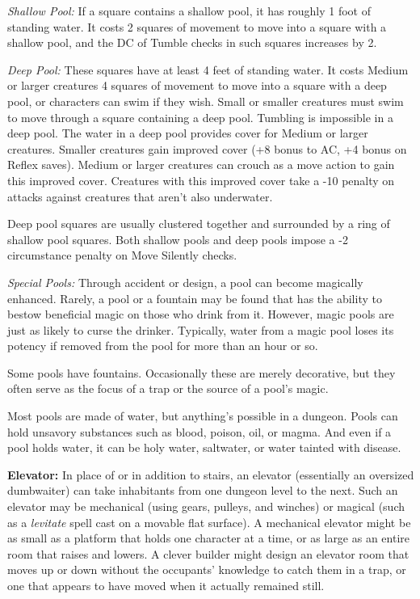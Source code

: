 \documentclass{article}
\begin{document}
\textit{Shallow Pool: }If a square contains a shallow pool, it has roughly 1 foot 
of standing water. It costs 2 squares of movement to move into a square with a 
shallow pool, and the DC of Tumble checks in such squares increases by 2.

\textit{Deep Pool: }These squares have at least 4 feet of standing water. It costs 
Medium or larger creatures 4 squares of movement to move into a square with a deep 
pool, or characters can swim if they wish. Small or smaller creatures must swim 
to move through a square containing a deep pool. Tumbling is impossible in a deep 
pool. The water in a deep pool provides cover for Medium or larger creatures. Smaller 
creatures gain improved cover (+8 bonus to AC, +4 bonus on Reflex saves). Medium 
or larger creatures can crouch as a move action to gain this improved cover. Creatures 
with this improved cover take a -10 penalty on attacks against creatures that aren't 
also underwater. 

Deep pool squares are usually clustered together and surrounded by a ring of shallow 
pool squares. Both shallow pools and deep pools impose a -2 circumstance penalty 
on Move Silently checks.

\textit{Special Pools: }Through accident or design, a pool can become magically 
enhanced. Rarely, a pool or a fountain may be found that has the ability to bestow 
beneficial magic on those who drink from it. However, magic pools are just as likely 
to curse the drinker. Typically, water from a magic pool loses its potency if removed 
from the pool for more than an hour or so.

Some pools have fountains. Occasionally these are merely decorative, but they often 
serve as the focus of a trap or the source of a pool's magic.

Most pools are made of water, but anything's possible in a dungeon. Pools can hold 
unsavory substances such as blood, poison, oil, or magma. And even if a pool holds 
water, it can be holy water, saltwater, or water tainted with disease.

\textbf{Elevator: }In place of or in addition to stairs, an elevator (essentially 
an oversized dumbwaiter) can take inhabitants from one dungeon level to the next. 
Such an elevator may be mechanical (using gears, pulleys, and winches) or magical 
(such as a \textit{levitate }spell cast on a movable flat surface). A mechanical 
elevator might be as small as a platform that holds one character at a time, or 
as large as an entire room that raises and lowers. A clever builder might design 
an elevator room that moves up or down without the occupants' knowledge to catch 
them in a trap, or one that appears to have moved when it actually remained still. 
\end{document}
